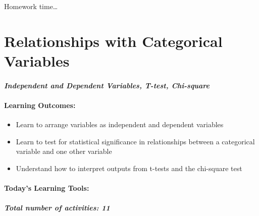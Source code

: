 \documentclass[
]{book}
\providecommand{\tightlist}{%
  \setlength{\itemsep}{0pt}\setlength{\parskip}{0pt}}
\begin{document}
Homework time\ldots{}

\hypertarget{relationships-with-categorical-variables}{%
\chapter{Relationships with Categorical Variables}\label{relationships-with-categorical-variables}}

\hypertarget{independent-and-dependent-variables-t-test-chi-square}{%
\subsubsection*{\texorpdfstring{\emph{Independent and Dependent Variables, T-test, Chi-square}}{Independent and Dependent Variables, T-test, Chi-square}}\label{independent-and-dependent-variables-t-test-chi-square}}

\hypertarget{learning-outcomes-6}{%
\subsubsection*{Learning Outcomes:}\label{learning-outcomes-6}}

\begin{itemize}
\tightlist
\item
  Learn to arrange variables as independent and dependent variables
\item
  Learn to test for statistical significance in relationships between a categorical variable and one other variable
\item
  Understand how to interpret outputs from t-tests and the chi-square test
\end{itemize}

\hypertarget{todays-learning-tools-6}{%
\subsubsection*{Today's Learning Tools:}\label{todays-learning-tools-6}}

\hypertarget{total-number-of-activities-11}{%
\paragraph*{\texorpdfstring{\emph{Total number of activities}: 11}{Total number of activities: 11}}\label{total-number-of-activities-11}}
\end{document}
